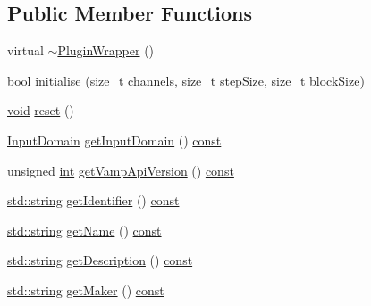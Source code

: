 \subsection*{Public Member Functions}
\begin{DoxyCompactItemize}
\item 
virtual \hyperlink{class_vamp_1_1_host_ext_1_1_plugin_wrapper_a7449a364d524de75352a4719fec2e1f5}{$\sim$\+Plugin\+Wrapper} ()
\item 
\hyperlink{mac_2config_2i386_2lib-src_2libsoxr_2soxr-config_8h_abb452686968e48b67397da5f97445f5b}{bool} \hyperlink{class_vamp_1_1_host_ext_1_1_plugin_wrapper_aa5a1f8290d8e9a315695584dcb3ad137}{initialise} (size\+\_\+t channels, size\+\_\+t step\+Size, size\+\_\+t block\+Size)
\item 
\hyperlink{sound_8c_ae35f5844602719cf66324f4de2a658b3}{void} \hyperlink{class_vamp_1_1_host_ext_1_1_plugin_wrapper_ad19cc0614ba41cdc26ef3394c5146fe6}{reset} ()
\item 
\hyperlink{class_vamp_1_1_plugin_a39cb7649d6dcc20e4cb1640cd55907bc}{Input\+Domain} \hyperlink{class_vamp_1_1_host_ext_1_1_plugin_wrapper_a031aa818fd48fd0f4b5e1bf80c032870}{get\+Input\+Domain} () \hyperlink{getopt1_8c_a2c212835823e3c54a8ab6d95c652660e}{const} 
\item 
unsigned \hyperlink{xmltok_8h_a5a0d4a5641ce434f1d23533f2b2e6653}{int} \hyperlink{class_vamp_1_1_host_ext_1_1_plugin_wrapper_a74147fda6b44ff2169bd4a1eea0d46ff}{get\+Vamp\+Api\+Version} () \hyperlink{getopt1_8c_a2c212835823e3c54a8ab6d95c652660e}{const} 
\item 
\hyperlink{test__lib_f_l_a_c_2format_8c_ab02026ad0de9fb6c1b4233deb0a00c75}{std\+::string} \hyperlink{class_vamp_1_1_host_ext_1_1_plugin_wrapper_a4baa9e48f717c2b3e7f92496aa39d904}{get\+Identifier} () \hyperlink{getopt1_8c_a2c212835823e3c54a8ab6d95c652660e}{const} 
\item 
\hyperlink{test__lib_f_l_a_c_2format_8c_ab02026ad0de9fb6c1b4233deb0a00c75}{std\+::string} \hyperlink{class_vamp_1_1_host_ext_1_1_plugin_wrapper_ac70a3265bb25aeb03f6dd8f8a0442088}{get\+Name} () \hyperlink{getopt1_8c_a2c212835823e3c54a8ab6d95c652660e}{const} 
\item 
\hyperlink{test__lib_f_l_a_c_2format_8c_ab02026ad0de9fb6c1b4233deb0a00c75}{std\+::string} \hyperlink{class_vamp_1_1_host_ext_1_1_plugin_wrapper_ac334f699c0996055942785410d8a065c}{get\+Description} () \hyperlink{getopt1_8c_a2c212835823e3c54a8ab6d95c652660e}{const} 
\item 
\hyperlink{test__lib_f_l_a_c_2format_8c_ab02026ad0de9fb6c1b4233deb0a00c75}{std\+::string} \hyperlink{class_vamp_1_1_host_ext_1_1_plugin_wrapper_a59d5a2298951b317995675e664b1c7bb}{get\+Maker} () \hyperlink{getopt1_8c_a2c212835823e3c54a8ab6d95c652660e}{const} 

\end{DoxyCompactItemize}
